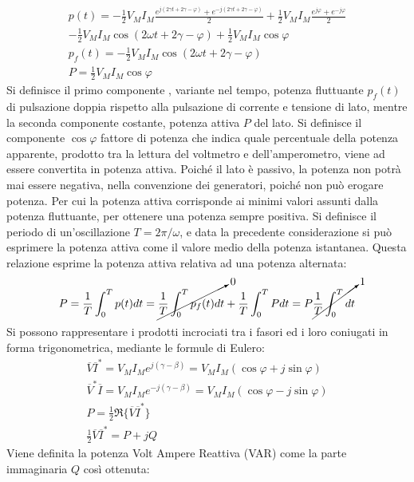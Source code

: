\documentclass{article}
\numberwithin{equation}{subsection}
\begin{document}
\begin{gather*}
    p(t)=\displaystyle-\frac{1}{2}V_MI_M\frac{e^{j(2\gamma t+2\gamma-\varphi)}+e^{-j(2\gamma t+2\gamma-\varphi)}}{2}+\frac{1}{2}V_MI_M\frac{e^{j\varphi}+e^{-j\varphi}}{2}\\
    -\displaystyle\frac{1}{2}V_MI_M\cos(2\omega t+2\gamma-\varphi)+\frac{1}{2}V_MI_M\cos\varphi\\
    p_f(t)=-\displaystyle\frac{1}{2}V_MI_M\cos(2\omega t+2\gamma-\varphi)\\
    P=\displaystyle\frac{1}{2}V_MI_M\cos\varphi
\end{gather*}
Si definisce il primo componente , variante nel tempo, potenza fluttuante $p_f(t)$ di pulsazione doppia rispetto alla pulsazione di corrente e tensione di lato, mentre la seconda 
componente costante, potenza attiva $P$ del lato. Si definisce il componente $\cos\varphi$ fattore di potenza che indica quale percentuale della potenza apparente, prodotto 
tra la lettura del voltmetro e dell'amperometro, viene ad essere convertita in potenza attiva. 
Poiché il lato è passivo, la potenza non potrà mai essere negativa, nella convenzione dei generatori, poiché non può erogare potenza. Per cui la potenza attiva corrisponde 
ai minimi valori assunti dalla potenza fluttuante, per ottenere una potenza sempre positiva. 
Si definisce il periodo di un'oscillazione $T=2\pi/\omega$, e data la precedente considerazione si può esprimere la potenza attiva come il valore medio della potenza 
istantanea. Questa relazione esprime la potenza attiva relativa ad una potenza alternata:
\begin{gather}
    P=\displaystyle\frac{1}{T}\int_0^Tp(t)dt=\cancelto{0}{\frac{1}{T}\int_0^Tp_f(t)dt}+\frac{1}{T}\int_0^TPdt=P\cancelto{1}{\frac{1}{T}\int_0^Tdt}\\
\end{gather}
Si possono rappresentare i prodotti incrociati tra i fasori ed i loro coniugati in forma trigonometrica, mediante le formule di Eulero: 
\begin{gather*}
    \overline{V}\overline{I}^*=V_MI_Me^{j(\gamma-\beta)}=V_MI_M\left(\cos\varphi+j\sin\varphi\right)\\
    \overline{V}^*\overline{I}=V_MI_Me^{-j(\gamma-\beta)}=V_MI_M\left(\cos\varphi-j\sin\varphi\right)\\
    P=\displaystyle\frac{1}{2}\Re\{\overline{V}\overline{I}^*\}\\
    \displaystyle\frac{1}{2}\overline{V}\overline{I}^*=P+jQ
\end{gather*}
Viene definita la potenza Volt Ampere Reattiva (VAR) come la parte immaginaria $Q$ così ottenuta: 
\end{document}
